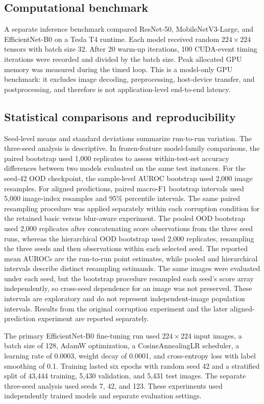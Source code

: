 \documentclass{sbc2023}%
\begin{document}
\subsection{Computational benchmark}
A separate inference benchmark compared ResNet-50, MobileNetV3-Large, and EfficientNet-B0 on a Tesla T4 runtime. Each model received random $224\times224$ tensors with batch size 32. After 20 warm-up iterations, 100 CUDA-event timing iterations were recorded and divided by the batch size. Peak allocated GPU memory was measured during the timed loop. This is a model-only GPU benchmark: it excludes image decoding, preprocessing, host-device transfer, and postprocessing, and therefore is not application-level end-to-end latency.

\subsection{Statistical comparisons and reproducibility}
Seed-level means and standard deviations summarize run-to-run variation. The three-seed analysis is descriptive. In frozen-feature model-family comparisons, the paired bootstrap used 1,000 replicates to assess within-test-set accuracy differences between two models evaluated on the same test instances. For the seed-42 OOD checkpoint, the sample-level AUROC bootstrap used 2,000 image resamples. For aligned predictions, paired macro-F1 bootstrap intervals used 5,000 image-index resamples and 95\% percentile intervals. The same paired resampling procedure was applied separately within each corruption condition for the retained basic versus blur-aware experiment. The pooled OOD bootstrap used 2,000 replicates after concatenating score observations from the three seed runs, whereas the hierarchical OOD bootstrap used 2,000 replicates, resampling the three seeds and then observations within each selected seed. The reported mean AUROCs are the run-to-run point estimates, while pooled and hierarchical intervals describe distinct resampling estimands. The same images were evaluated under each seed, but the bootstrap procedure resampled each seed's score array independently, so cross-seed dependence for an image was not preserved. These intervals are exploratory and do not represent independent-image population intervals. Results from the original corruption experiment and the later aligned-prediction experiment are reported separately.

The primary EfficientNet-B0 fine-tuning run used $224\times224$ input images, a batch size of 128, AdamW optimization, a CosineAnnealingLR scheduler, a learning rate of 0.0003, weight decay of 0.0001, and cross-entropy loss with label smoothing of 0.1. Training lasted six epochs with random seed 42 and a stratified split of 43,444 training, 5,430 validation, and 5,431 test images. The separate three-seed analysis used seeds 7, 42, and 123. These experiments used independently trained models and separate evaluation settings.
\end{document}
